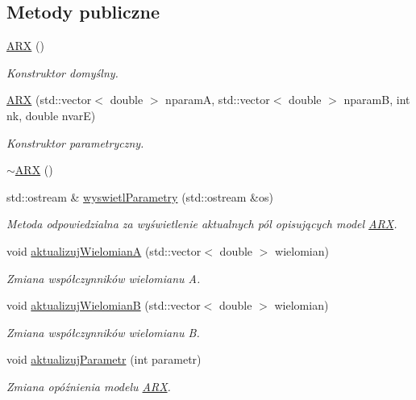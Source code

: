\subsection*{Metody publiczne}
\begin{DoxyCompactItemize}
\item 
\hyperlink{class_a_r_x_a33446ecffef6c604cae4b0376dc90d30}{A\-R\-X} ()
\begin{DoxyCompactList}\small\item\em Konstruktor domyślny. \end{DoxyCompactList}\item 
\hyperlink{class_a_r_x_a4e4ddffa5a0de70e864728340e5bdd1e}{A\-R\-X} (std\-::vector$<$ double $>$ nparam\-A, std\-::vector$<$ double $>$ nparam\-B, int nk, double nvar\-E)
\begin{DoxyCompactList}\small\item\em Konstruktor parametryczny. \end{DoxyCompactList}\item 
\hyperlink{class_a_r_x_abbba12ab36a3f0a6536938b242271c9f}{$\sim$\-A\-R\-X} ()
\item 
std\-::ostream \& \hyperlink{class_a_r_x_a8660da07ee58cf49db7bcf61affbf568}{wyswietl\-Parametry} (std\-::ostream \&os)
\begin{DoxyCompactList}\small\item\em Metoda odpowiedzialna za wyświetlenie aktualnych pól opisujących model \hyperlink{class_a_r_x}{A\-R\-X}. \end{DoxyCompactList}\item 
void \hyperlink{class_a_r_x_a0ea5d18350bae9be968171e5f2077d0f}{aktualizuj\-Wielomian\-A} (std\-::vector$<$ double $>$ wielomian)
\begin{DoxyCompactList}\small\item\em Zmiana współczynników wielomianu A. \end{DoxyCompactList}\item 
void \hyperlink{class_a_r_x_abaef0e431556e7a22180c35b2306a55a}{aktualizuj\-Wielomian\-B} (std\-::vector$<$ double $>$ wielomian)
\begin{DoxyCompactList}\small\item\em Zmiana współczynników wielomianu B. \end{DoxyCompactList}\item 
void \hyperlink{class_a_r_x_a9ceed0a5f96290dccb956ae8b2077bff}{aktualizuj\-Parametr} (int parametr)
\begin{DoxyCompactList}\small\item\em Zmiana opóźnienia modelu \hyperlink{class_a_r_x}{A\-R\-X}. \end{DoxyCompactList}\item 

\end{DoxyCompactItemize}
